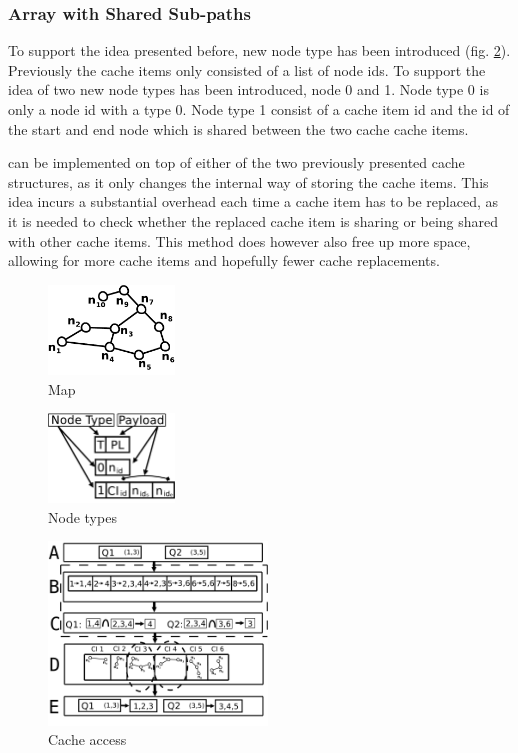 \subsubsection{Array with Shared Sub-paths}
To support the \sps idea presented before, new node type has been introduced (fig. \ref{fig:nodetypes}). Previously the cache items only consisted of a list of node ids. To support the idea of \sps two new node types has been introduced, node 0 and 1. Node type 0 is only a node id with a type 0. Node type 1 consist of a cache item id and the id of the start and end node which is shared between the two cache cache items.

can be implemented on top of either of the two previously presented cache structures, as it only changes the internal way of storing the cache items. This idea incurs a substantial overhead each time a cache item has to be replaced, as it is needed to check whether the replaced cache item is sharing or being shared with other cache items. This method does however also free up more space, allowing for more cache items and hopefully fewer cache replacements.


\begin{figure}
  \center
	\includegraphics[width=0.3\textwidth]{figures/map10n.pdf}
	\caption{Map}
  \label{fig:map10}
\end{figure}

\begin{figure}
  \center
	\includegraphics[width=0.3\textwidth]{figures/nodeType.pdf}
	\caption{Node types}
  \label{fig:nodetypes}
\end{figure}

\begin{figure}
  \center
	\includegraphics[width=0.52\textwidth]{figures/cacheTwoLayer.pdf}
	\caption{Cache access}
  \label{fig:cachestruc}
\end{figure}



